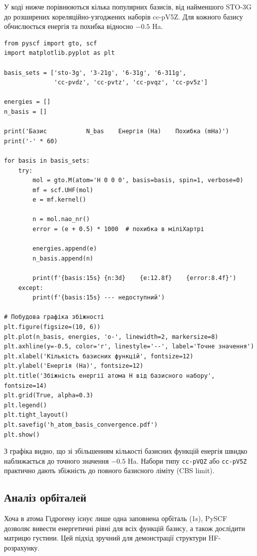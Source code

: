 У коді нижче порівнюються кілька популярних базисів, від найменшого STO-3G до розширених кореляційно-узгоджених наборів cc-pV5Z. Для кожного базису обчислюється енергія та похибка відносно \(-0.5\) Ha.

\begin{verbatim}
from pyscf import gto, scf
import matplotlib.pyplot as plt

basis_sets = ['sto-3g', '3-21g', '6-31g', '6-311g',
              'cc-pvdz', 'cc-pvtz', 'cc-pvqz', 'cc-pv5z']

energies = []
n_basis = []

print('Базис           N_bas    Енергія (Ha)    Похибка (mHa)')
print('-' * 60)

for basis in basis_sets:
    try:
        mol = gto.M(atom='H 0 0 0', basis=basis, spin=1, verbose=0)
        mf = scf.UHF(mol)
        e = mf.kernel()

        n = mol.nao_nr()
        error = (e + 0.5) * 1000  # похибка в міліХартрі

        energies.append(e)
        n_basis.append(n)

        print(f'{basis:15s} {n:3d}    {e:12.8f}    {error:8.4f}')
    except:
        print(f'{basis:15s} --- недоступний')

# Побудова графіка збіжності
plt.figure(figsize=(10, 6))
plt.plot(n_basis, energies, 'o-', linewidth=2, markersize=8)
plt.axhline(y=-0.5, color='r', linestyle='--', label='Точне значення')
plt.xlabel('Кількість базисних функцій', fontsize=12)
plt.ylabel('Енергія (Ha)', fontsize=12)
plt.title('Збіжність енергії атома H від базисного набору', fontsize=14)
plt.grid(True, alpha=0.3)
plt.legend()
plt.tight_layout()
plt.savefig('h_atom_basis_convergence.pdf')
plt.show()
\end{verbatim}

З графіка видно, що зі збільшенням кількості базисних функцій енергія швидко наближається до точного значення \(-0.5\) Ha.
Набори типу \texttt{cc-pVQZ} або \texttt{cc-pV5Z} практично дають збіжність до повного базисного ліміту (CBS limit).

\subsection{Аналіз орбіталей}

Хоча в атома Гідрогену існує лише одна заповнена орбіталь (1s), PySCF дозволяє вивести енергетичні рівні для всіх функцій базису, а також дослідити матрицю густини.
Цей підхід зручний для демонстрації структури HF-розрахунку.


